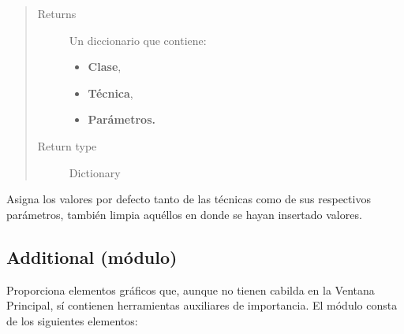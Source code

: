\documentclass[class=report, crop=false]{standalone}
\begin{document}
\begin{fulllineitems}
\begin{fulllineitems}
\begin{quote}\begin{description}
\item[{Returns}] \leavevmode

Un diccionario que contiene:

\begin{itemize}
\item \textbf{Clase},
\item \textbf{Técnica},
\item \textbf{Parámetros.}
\end{itemize}

\item[{Return type}] \leavevmode
Dictionary
\end{description}\end{quote}

\end{fulllineitems}

\begin{fulllineitems}

Asigna los valores por defecto tanto de las técnicas como de sus 
respectivos parámetros, también limpia aquéllos en donde se hayan 
insertado valores.

\end{fulllineitems}

\end{fulllineitems}

\subsection{Additional (módulo)}
\label{sec:a_3_3}
Proporciona elementos gráficos que, aunque no tienen cabilda 
en la Ventana Principal, sí contienen herramientas auxiliares 
de importancia.\medskip\break
El módulo consta de los siguientes elementos:

\end{document}
